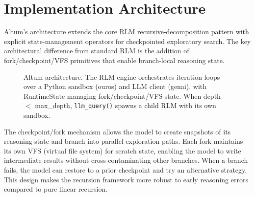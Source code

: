\documentclass[11pt]{article}
\begin{document}
\section{Implementation Architecture}

Altum's architecture extends the core RLM recursive-decomposition pattern \cite{zhang2025rlm} with explicit state-management operators for checkpointed exploratory search. The key architectural difference from standard RLM is the addition of fork/checkpoint/VFS primitives that enable branch-local reasoning state.

\begin{figure}[t]
\centering
{}
\caption{Altum architecture. The RLM engine orchestrates iteration loops over a Python sandbox (ouros) and LLM client (genai), with RuntimeState managing fork/checkpoint/VFS state. When depth $<$ max\_depth, \texttt{llm\_query()} spawns a child RLM with its own sandbox.}
\label{fig:architecture}
\end{figure}

The checkpoint/fork mechanism allows the model to create snapshots of its reasoning state and branch into parallel exploration paths. Each fork maintains its own VFS (virtual file system) for scratch state, enabling the model to write intermediate results without cross-contaminating other branches. When a branch fails, the model can restore to a prior checkpoint and try an alternative strategy. This design makes the recursion framework more robust to early reasoning errors compared to pure linear recursion.
\end{document}
